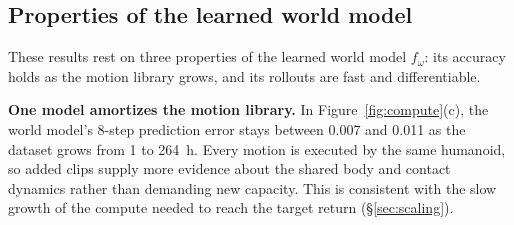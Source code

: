 \subsection{Properties of the learned world model}
\label{sec:wm-properties}

These results rest on three properties of the learned world model $f_\omega$: its accuracy holds as the motion library grows, and its rollouts are fast and differentiable.

\noindent\textbf{One model amortizes the motion library.} In Figure~\ref{fig:compute}(c), the world model's 8-step prediction error stays between 0.007 and 0.011 as the dataset grows from 1 to \qty{264}{\hour}. Every motion is executed by the same humanoid, so added clips supply more evidence about the shared body and contact dynamics rather than demanding new capacity. This is consistent with the slow growth of the compute needed to reach the target return (\S\ref{sec:scaling}).

